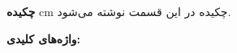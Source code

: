 
\thispagestyle{plain}


\noindent
\textbf{\Large چکیده}
 cm
چکیده در این قسمت نوشته می‌شود.

\vskip 3cm
\noindent
\textbf{واژه‌های کلیدی:}
